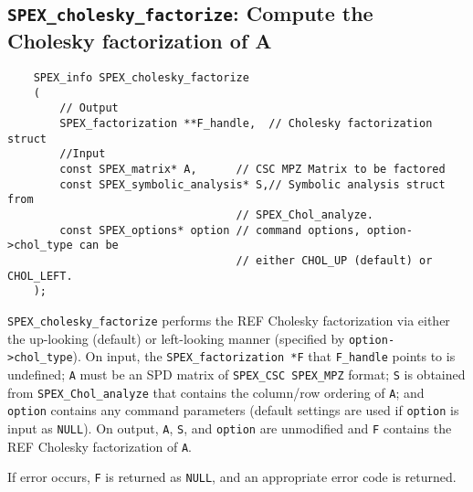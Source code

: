 \documentclass[12pt,oneside]{book}
\theoremstyle{definition}
\begin{document}
\subsection{\texttt{SPEX\_cholesky\_factorize}: Compute the Cholesky factorization of A} \label{ss:spex_chol_factorize}
\begin{mdframed}[userdefinedwidth=\textwidth]
{\footnotesize
\begin{verbatim}
    SPEX_info SPEX_cholesky_factorize
    (
        // Output
        SPEX_factorization **F_handle,  // Cholesky factorization struct
        //Input
        const SPEX_matrix* A,      // CSC MPZ Matrix to be factored   
        const SPEX_symbolic_analysis* S,// Symbolic analysis struct from
                                   // SPEX_Chol_analyze.
        const SPEX_options* option // command options, option->chol_type can be
                                   // either CHOL_UP (default) or CHOL_LEFT.
    );
\end{verbatim}
} \end{mdframed}

\verb|SPEX_cholesky_factorize| performs the REF Cholesky factorization via either the up-looking  (default) or left-looking manner (specified by \verb|option->chol_type|). On input, the \verb|SPEX_factorization *F| that \verb|F_handle| points to is undefined; \verb|A| must be an SPD matrix of \verb|SPEX_CSC SPEX_MPZ| format; \verb|S| is obtained from \verb|SPEX_Chol_analyze| that contains the column/row ordering of \verb|A|; and \verb|option| contains any command parameters   (default settings are used if
\verb|option| is input as \verb|NULL|). On output, \verb|A|, \verb|S|, and \verb|option| are unmodified and \verb|F| contains the REF Cholesky factorization of \verb|A|.


If error occurs, \verb|F| is returned as \verb|NULL|, and an appropriate error code is returned.

\newpage
\end{document}
